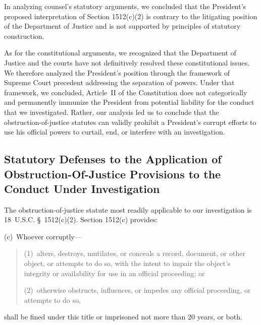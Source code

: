 In analyzing counsel's statutory arguments, we concluded that the President's proposed interpretation of Section 1512(c)(2) is contrary to the litigating position of the Department of Justice and is not supported by principles of statutory construction.

As for the constitutional arguments, we recognized that the Department of Justice and the courts have not definitively resolved these constitutional issues.
We therefore analyzed the President's position through the framework of Supreme Court precedent addressing the separation of powers.
Under that framework, we concluded, Article~II of the Constitution does not categorically and permanently immunize the President from potential liability for the conduct that we investigated.
Rather, our analysis led us to conclude that the obstruction-of-justice statutes can validly prohibit a President's corrupt efforts to use his official powers to curtail, end, or interfere with an investigation.

\subsection{Statutory Defenses to the Application of Obstruction-Of-Justice Provisions to the Conduct Under Investigation}

The obstruction-of-justice statute most readily applicable to our investigation is 18~U.S.C. \S~1512(c)(2). Section 1512(c) provides:

(c)~Whoever corruptly---

\begin{quote}
(1)~alters, destroys, mutilates, or conceals a record, document, or other object, or attempts to do so, with the intent to impair the object's integrity or availability for use in an official proceeding; or

(2)~otherwise obstructs, influences, or impedes any official proceeding, or attempts to do so,
\end{quote}

shall be fined under this title or imprisoned not more than 20 years, or both.

